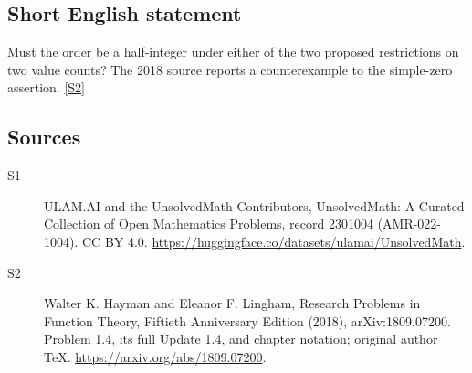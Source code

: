 \documentclass[11pt]{article}
\newcommand{\sref}[2]{\hyperlink{source:#1:#2}{[S#2]}}
\begin{document}
\subsection{Short English statement}
Must the order be a half-integer under either of the two proposed restrictions on two value counts? The 2018 source reports a counterexample to the simple-zero assertion. \sref{2301004}{2}
\subsection{Sources}
\begin{description}
\item[\hypertarget{source:2301004:1}{S1}] ULAM.AI and the UnsolvedMath Contributors, UnsolvedMath: A Curated Collection of Open Mathematics Problems, record 2301004 (AMR-022-1004). CC BY 4.0. \url{https://huggingface.co/datasets/ulamai/UnsolvedMath}.
\item[\hypertarget{source:2301004:2}{S2}] Walter K. Hayman and Eleanor F. Lingham, Research Problems in Function Theory, Fiftieth Anniversary Edition (2018), arXiv:1809.07200. Problem 1.4, its full Update 1.4, and chapter notation; original author TeX. \url{https://arxiv.org/abs/1809.07200}.
\end{description}
\label{end:2301004}
\end{document}
